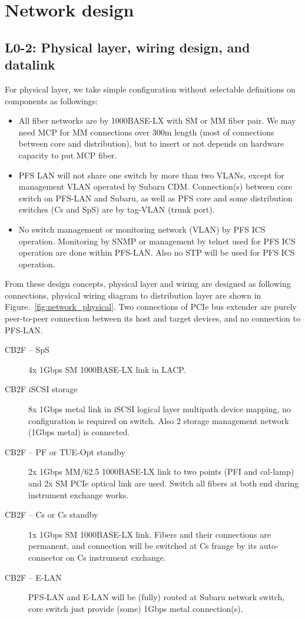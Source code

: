 \documentclass[a4paper,notitlepage]{article}
\begin{document}
\section{Network design}

\subsection{L0-2: Physical layer, wiring design, and datalink}

For physical layer, we take simple configuration without selectable definitions 
on components as followings:

\begin{itemize}
  \item All fiber networks are by 1000BASE-LX with SM or MM fiber pair. We may 
    need MCP for MM connections over 300m length (most of connections between 
    core and distribution), but to insert or not depends on hardware capacity 
    to put MCP fiber.
  \item PFS LAN will not share one switch by more than two VLANs, except for 
    management VLAN operated by Subaru CDM. Connection(s) between core switch 
    on PFS-LAN and Subaru, as well as PFS core and some distribution switches 
    (Cs and SpS) are by tag-VLAN (trunk port). 
  \item No switch management or monitoring network (VLAN) by PFS ICS operation. 
    Monitoring by SNMP or management by telnet used for PFS ICS operation are 
    done within PFS-LAN. Also no STP will be used for PFS ICS operation.
\end{itemize}

From these design concepts, physical layer and wiring are designed as following 
connections, physical wiring diagram to distribution layer are shown in 
Figure.~\ref{fig:network_physical}. 
Two connections of PCIe bus extender are purely peer-to-peer connection between 
its host and target devices, and no connection to PFS-LAN. 

\begin{description}
  \item [CB2F -- SpS] 4x 1Gbps SM 1000BASE-LX link in LACP.
  \item [CB2F iSCSI storage] 8x 1Gbps metal link in iSCSI logical layer 
    multipath device mapping, no configuration is required on switch. 
    Also 2 storage management network (1Gbps metal) is connected.
  \item [CB2F -- PF or TUE-Opt standby] 2x 1Gbps MM/62.5 1000BASE-LX link 
    to two points (PFI and cal-lamp) and 2x SM PCIe optical link are used. 
    Switch all fibers at both end during instrument exchange works.
  \item [CB2F -- Cs or Cs standby] 1x 1Gbps SM 1000BASE-LX link. Fibers and 
    their connections are permanent, and connection will be switched at Cs 
    frange by its auto-connector on Cs instrument exchange.
  \item [CB2F -- E-LAN] PFS-LAN and E-LAN will be (fully) routed at Subaru 
    network switch, core switch just provide (some) 1Gbps metal connection(s).
\end{description}
\end{document}
